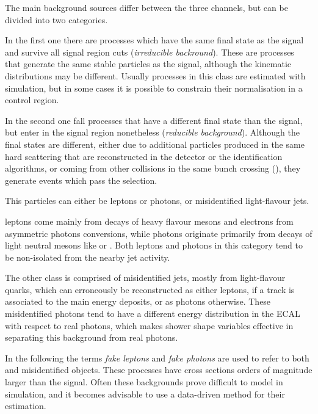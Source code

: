 \label{sec:backgrounds}
The main background sources differ between the three channels, but can be divided into two categories.

In the first one there are processes which have the same final state as the signal and survive all signal region cuts (\textit{irreducible backround}).
These are processes that generate the same stable particles as the signal,
although the kinematic distributions may be different.
Usually processes in this class are estimated with simulation,
but in some cases it is possible to constrain their normalisation in a control region.

In the second one fall processes that have a different final state than the signal, but enter in the signal region nonetheless (\textit{reducible background}).
Although the final states are different,
either due to additional particles produced in the same hard scattering
that are reconstructed in the detector or the identification algorithms,
or coming from other collisions in the same bunch crossing (\pileup),
they generate events which pass the selection.

This particles can either be \nonprompt leptons or photons, or misidentified light-flavour jets.

\Nonprompt leptons come mainly from decays of heavy flavour mesons and electrons from asymmetric photons conversions,
while \nonprompt photons originate primarily from decays of light neutral mesons like \PGpz or \PGh.
Both leptons and photons in this category tend to be non-isolated from the nearby jet activity.

The other class is comprised of misidentified jets, mostly from light-flavour quarks, which can erroneously be reconstructed as either leptons,
if a track is associated to the main energy deposits, or as photons otherwise.
These misidentified photons tend to have a different energy distribution in the ECAL with respect to real photons,
which makes shower shape variables effective in separating this background from real photons.

In the following the terms \textit{fake leptons} and \textit{fake photons} are used to refer to both \nonprompt and misidentified objects.
These processes have cross sections orders of magnitude larger than the signal.
Often these backgrounds prove difficult to model in simulation,
and it becomes advisable to use a data-driven method for their estimation.

